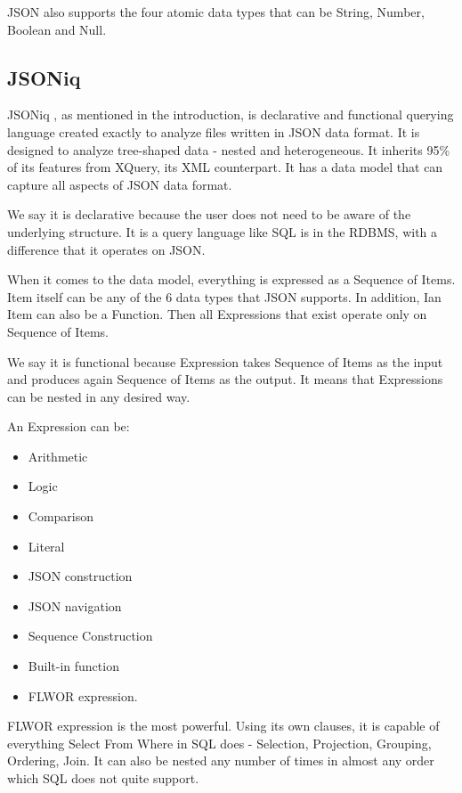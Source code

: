 JSON also supports the four atomic data types that can be String, Number, Boolean and Null.

\subsection{JSONiq}
\label{sec:JSONiq}
JSONiq \cite{JSONiqPaper}, as mentioned in the introduction, is declarative and functional querying language created exactly to analyze files written in JSON data format. It is designed to analyze tree-shaped data - nested and heterogeneous. It inherits 95\% of its features from XQuery, its XML counterpart. It has a data model that can capture all aspects of JSON data format. 

We say it is declarative because the user does not need to be aware of the underlying structure. It is a query language like SQL is in the RDBMS, with a difference that it operates on JSON.

When it comes to the data model, everything is expressed as a Sequence of Items. Item itself can be any of the 6 data types that JSON supports. In addition, Ian Item can also be a Function. Then all Expressions that exist operate only on Sequence of Items. 

We say it is functional because Expression takes Sequence of Items as the input and produces again Sequence of Items as the output. It means that Expressions can be nested in any desired way.

An Expression can be: 
\begin{itemize}
	\item Arithmetic
	\item Logic
	\item Comparison
	\item Literal
	\item JSON construction
	\item JSON navigation
	\item Sequence Construction
	\item Built-in function
	\item FLWOR expression.
\end{itemize} 

FLWOR expression is the most powerful. Using its own clauses, it is capable of everything Select From Where in SQL does - Selection, Projection, Grouping, Ordering, Join. It can also be nested any number of times in almost any order which SQL does not quite support. \cite{JSONiqBook}

